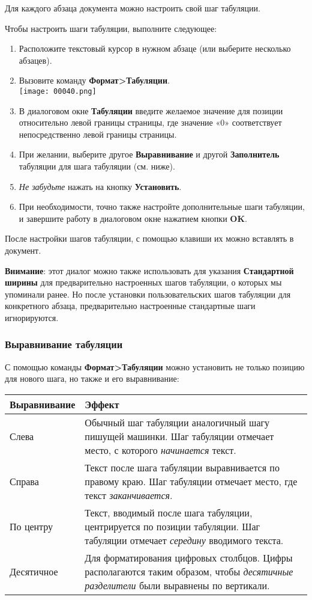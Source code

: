 \documentclass[a4paper,10pt]{article}
\begin{document}
Для каждого абзаца документа можно настроить свой шаг табуляции.

Чтобы настроить шаги табуляции, выполните следующее:
\begin{enumerate}
 \item Расположите текстовый курсор в нужном абзаце (или выберите несколько абзацев).
 \item Вызовите команду \textbf{Формат>Табуляции}.\\
 \texttt{[image: 00040.png]}
 \item В диалоговом окне \textbf{Табуляции} введите желаемое значение для позиции относительно левой границы страницы, где значение «0» соответствует непосредственно левой границы страницы.
 \item При желании, выберите другое \textbf{Выравнивание} и другой \textbf{Заполнитель} табуляции для шага табуляции (см. ниже).
 \item \textit{Не забудьте} нажать на кнопку \textbf{Установить}.
 \item При необходимости, точно также настройте дополнительные шаги табуляции, и завершите работу в диалоговом окне нажатием кнопки \textbf{OK}.
\end{enumerate}

После настройки шагов табуляции, с помощью клавиши  их можно вставлять в документ.

\textbf{Внимание}: этот диалог можно также использовать для указания \textbf{Стандартной ширины} для предварительно настроенных шагов табуляции, о которых мы упоминали ранее. Но после установки пользовательских шагов табуляции для конкретного абзаца, предварительно настроенные стандартные шаги игнорируются.

\subsubsection{Выравнивание табуляции}
С помощью команды \textbf{Формат>Табуляции} можно установить не только позицию для нового шага, но также и его выравнивание:

\begin{center}
\begin{tabular}{ | m{4cm} | m{10cm} | }
\hline
 \textbf{Выравнивание} & \textbf{Эффект} \\ 
 \hline
 Слева & Обычный шаг табуляции аналогичный шагу пишущей машинки. Шаг табуляции отмечает место, с которого \textit{начинается} текст.\\
\hline
Справа & Текст после шага табуляции выравнивается по правому краю. Шаг табуляции отмечает место, где текст \textit{заканчивается}.\\
\hline
По центру & Текст, вводимый после шага табуляции, центрируется по позиции табуляции. Шаг табуляции отмечает \textit{середину} вводимого текста.\\
\hline
Десятичное & Для форматирования цифровых столбцов. Цифры располагаются таким образом, чтобы \textit{десятичные разделители} были выравнены по вертикали.\\
\hline
\end{tabular}
\end{center}
\end{document}
